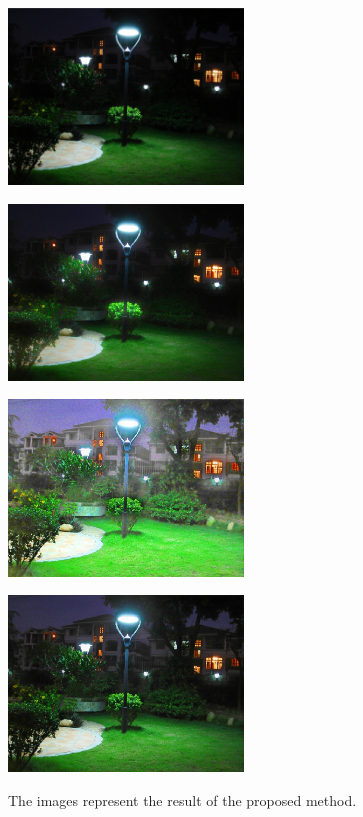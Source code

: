 \begin{figure}[tb]
\centering
	\begin{minipage}[b]{0.49\hsize}
		\centering
		\includegraphics[width=62.5mm]{images/proposed/input.eps}
		 \label{fig:proposed/input}
	\end{minipage}
	\begin{minipage}[b]{0.49\hsize}
		\centering
		\includegraphics[width=62.5mm]{images/proposed/illumination.eps}
		 \label{fig:proposed/illumination}
	\end{minipage}
	\begin{minipage}[b]{0.49\hsize}
		\centering
		\includegraphics[width=62.5mm]{images/proposed/reflectance.eps}
		 \label{fig:proposed/reflectance}
	\end{minipage}
	\begin{minipage}[b]{0.49\hsize}
		\centering
		\includegraphics[width=62.5mm]{images/proposed/output.eps}
		 \label{fig:proposed/enhanced}
	\end{minipage}
	\caption{The images represent the result of the proposed method.}
	\label{fig:proposed/output}
\end{figure}